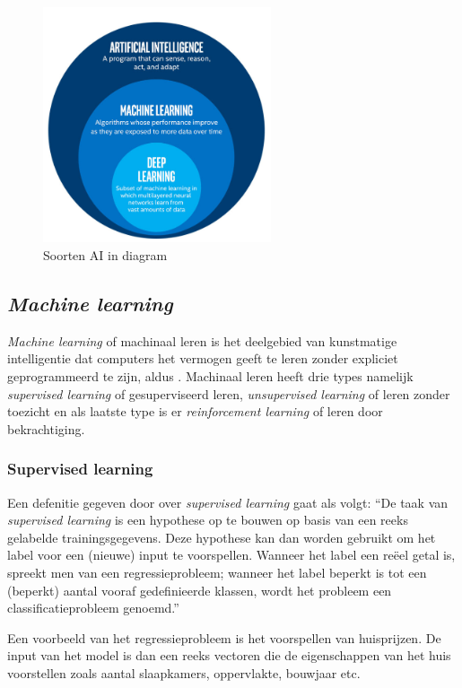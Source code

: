 \begin{figure}
    \centering
    \includegraphics[width=0.6\textwidth]{./img/ai_fields.png}
    \caption{\label{fig:soorten_ai_diagram} Soorten AI in diagram \autocite{Bansal2019}}
\end{figure}

\subsection{\textit{Machine learning}}
\textit{Machine learning} of machinaal leren is het deelgebied van kunstmatige intelligentie dat computers het vermogen geeft te leren zonder expliciet geprogrammeerd te zijn, aldus \textcite{Lievens2021}. Machinaal leren heeft drie types namelijk \textit{supervised learning} of gesuperviseerd leren, \textit{unsupervised learning} of leren zonder toezicht en als laatste type is er \textit{reinforcement learning} of leren door bekrachtiging.

\subsubsection{Supervised learning}
Een defenitie gegeven door \textcite{Lievens2021} over \textit{supervised learning} gaat als volgt: ``De taak van \textit{supervised learning} is een hypothese op te bouwen op basis van een reeks gelabelde trainingsgegevens. Deze hypothese kan dan worden gebruikt om het label voor een (nieuwe) input te voorspellen. Wanneer het label een reëel getal is, spreekt men van een regressieprobleem; wanneer het label beperkt is tot een (beperkt) aantal vooraf gedefinieerde klassen, wordt het probleem een classificatieprobleem genoemd.''

Een voorbeeld van het regressieprobleem is het voorspellen van huisprijzen. De input van het model is dan een reeks vectoren die de eigenschappen van het huis voorstellen zoals aantal slaapkamers, oppervlakte, bouwjaar etc.

